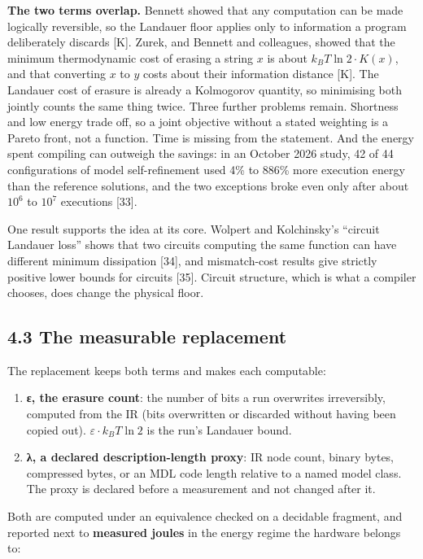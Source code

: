 \documentclass[10pt,letterpaper]{article}
\providecommand{\tightlist}{\setlength{\itemsep}{1pt}\setlength{\parskip}{0pt}}
\begin{document}
\textbf{The two terms overlap.} Bennett showed that any computation can
be made logically reversible, so the Landauer floor applies only to
information a program deliberately discards {[}K{]}. Zurek, and Bennett
and colleagues, showed that the minimum thermodynamic cost of erasing a
string \(x\) is about \(k_B T \ln 2 \cdot K(x)\), and that converting
\(x\) to \(y\) costs about their information distance {[}K{]}. The
Landauer cost of erasure is already a Kolmogorov quantity, so minimising
both jointly counts the same thing twice. Three further problems remain.
Shortness and low energy trade off, so a joint objective without a
stated weighting is a Pareto front, not a function. Time is missing from
the statement. And the energy spent compiling can outweigh the savings:
in an October 2026 study, 42 of 44 configurations of model
self-refinement used 4\% to 886\% more execution energy than the
reference solutions, and the two exceptions broke even only after about
\(10^6\) to \(10^7\) executions {[}33{]}.

One result supports the idea at its core. Wolpert and Kolchinsky's
``circuit Landauer loss'' shows that two circuits computing the same
function can have different minimum dissipation {[}34{]}, and
mismatch-cost results give strictly positive lower bounds for circuits
{[}35{]}. Circuit structure, which is what a compiler chooses, does
change the physical floor.

\subsection{4.3 The measurable
replacement}\label{the-measurable-replacement}

The replacement keeps both terms and makes each computable:

\begin{enumerate}
\def\labelenumi{\arabic{enumi}.}
\tightlist
\item
  \textbf{ε, the erasure count}: the number of bits a run overwrites
  irreversibly, computed from the IR (bits overwritten or discarded
  without having been copied out). \(\varepsilon \cdot k_B T \ln 2\) is
  the run's Landauer bound.
\item
  \textbf{λ, a declared description-length proxy}: IR node count, binary
  bytes, compressed bytes, or an MDL code length relative to a named
  model class. The proxy is declared before a measurement and not
  changed after it.
\end{enumerate}

Both are computed under an equivalence checked on a decidable fragment,
and reported next to \textbf{measured joules} in the energy regime the
hardware belongs to:
\end{document}
